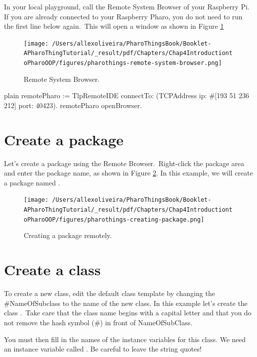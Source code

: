 \documentclass[10pt,twoside,english]{_support/latex/sbabook/sbabook}
\begin{document}
In your local playground, call the Remote System Browser of your Raspberry Pi. If you are already connected to your Raspberry Pharo, you do not need to run the first line below again. This will open a window as shown in Figure \ref{RemoteBrowser} 


\begin{figure}

\begin{center}
\texttt{[image: /Users/allexoliveira/PharoThingsBook/Booklet-APharoThingTutorial/\_result/pdf/Chapters/Chap4IntroductiontoPharoOOP/figures/pharothings-remote-system-browser.png]}\caption{Remote System Browser.\label{RemoteBrowser}}\end{center}
\end{figure}


\begin{displaycode}{plain}
remotePharo := TlpRemoteIDE connectTo: (TCPAddress ip: #[193 51 236 212] port: 40423).
remotePharo openBrowser.
\end{displaycode}
\section{Create a package}
Let's create a package using the Remote Browser. Right-click the package area and enter the package name, as shown in Figure \ref{CreatingPackage}. In this example, we will create a package named .


\begin{figure}

\begin{center}
\texttt{[image: /Users/allexoliveira/PharoThingsBook/Booklet-APharoThingTutorial/\_result/pdf/Chapters/Chap4IntroductiontoPharoOOP/figures/pharothings-creating-package.png]}\caption{Creating a package remotely.\label{CreatingPackage}}\end{center}
\end{figure}

\section{Create a class}
To create a new class, edit the default class template by changing the \#NameOfSubclass to the name of the new class. In this example let's create the class . Take care that the class name begins with a capital letter and that you do not remove the hash symbol (\#) in front of NameOfSubClass. 

You must then fill in the names of the instance variables for this class. We need an instance variable called . Be careful to leave the string quotes!
\end{document}
